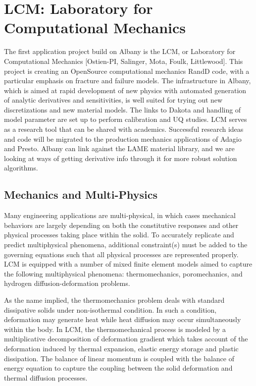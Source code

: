 \documentclass[pdf,12pt,report,strict]{SANDreport}
\theoremstyle{remark}
\begin{document}
\section{LCM: Laboratory for Computational Mechanics}

The first application project build on Albany is the LCM, or
Laboratory for Computational Mechanics [Ostien-PI, Salinger, Mota,
  Foulk, Littlewood]. This project is creating an OpenSource
computational mechanics RandD code, with a particular emphasis on
fracture and failure models. The infrastructure in Albany, which is
aimed at rapid development of new physics with automated generation of
analytic derivatives and sensitivities, is well suited for trying out
new discretizations and new material models. The links to Dakota and
handling of model parameter are set up to perform calibration and UQ
studies. LCM serves as a research tool that can be shared with
academics. Successful research ideas and code will be migrated to the
production mechanics applications of Adagio and Presto. Albany can
link against the LAME material library, and we are looking at ways of
getting derivative info through it for more robust solution
algorithms.  


\subsection{Mechanics and Multi-Physics}
Many engineering applications are multi-physical, in which cases 
mechanical behaviors are largely depending on both 
the constitutive responses and other physical processes taking 
place within the solid. To accurately replicate and predict multiphysical 
phenomena, additional constraint(s) must be added to the governing equations
 such that all physical processes are represented properly. 
LCM is equipped with a number of mixed finite element models aimed to capture
the following multiphysical phenomena: thermomechanics, poromechanics, and hydrogen diffusion-deformation problems. 

As the name implied, the thermomechanics problem deals with standard dissipative
 solids under non-isothermal condition. In such a condition, deformation may
  generate heat while heat diffusion may occur simultaneously within the body. 
In LCM, the thermomechanical process is modeled by a multiplicative decomposition 
of deformation gradient which takes account of the deformation induced by thermal
 expansion, elastic energy storage and plastic dissipation. The balance of 
linear momentum is coupled with the balance of energy equation to capture the
 coupling between the solid deformation and thermal diffusion processes. 
\end{document}
